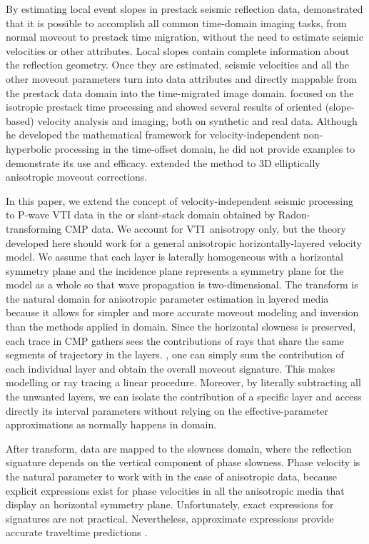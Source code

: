 By estimating local event slopes in prestack seismic reflection data,
\cite{fomel:S139} demonstrated that it is possible to accomplish all
common time-domain imaging tasks, from normal moveout to prestack time
migration, without the need to estimate seismic velocities or other
attributes. Local slopes contain complete information about the
reflection geometry. Once they are estimated, seismic velocities and
all the other moveout parameters turn into data attributes and
  directly mappable from the prestack data
domain into the time-migrated image domain. \cite{fomel:S139} focused
on the isotropic prestack time processing and showed several results
of oriented (slope-based) velocity analysis and imaging, both on
synthetic and real data. Although he developed the mathematical
framework for velocity-independent non-hyperbolic processing in the
time-offset \tx domain, he did not provide examples to demonstrate its
use and efficacy. \cite{burnett:WB129,burnett:3710} extended the
method to 3D elliptically anisotropic moveout corrections.

In this paper, we extend the concept of velocity-independent seismic
processing to P-wave VTI data in the \taup or slant-stack domain
obtained by Radon-transforming CMP data.  We account for
VTI\ anisotropy only, but the theory developed here should work for a
general anisotropic horizontally-layered velocity model. We assume
that each layer is laterally homogeneous with a horizontal symmetry
plane and  the incidence plane represents a symmetry plane
for the model as a whole so that wave propagation is
two-dimensional. The \taup transform is the natural domain for
anisotropic parameter estimation in layered media
\citep{baan:1076,douma:D53,fomel:2046} because it allows for simpler
and more accurate moveout modeling and inversion than the   methods applied in \tx domain. Since the
horizontal slowness is preserved, each trace in \taup CMP gathers sees
the contributions of rays that share the same segments of trajectory
in the layers.  , one can simply sum the
contribution of each individual layer and obtain the overall \taup
moveout signature. This makes modelling or ray tracing a linear
procedure. Moreover, by literally subtracting all the unwanted layers,
we can isolate the contribution of a specific layer and access
directly its interval parameters without relying on the
effective-parameter approximations as normally happens in \tx domain.

After \taup transform,  data are mapped to the slowness
domain, where the reflection signature depends on the vertical
component of phase slowness. Phase velocity is the natural parameter
to work with in the case of anisotropic data, because explicit
expressions exist for phase velocities in all the anisotropic media
that display an horizontal symmetry plane. Unfortunately, exact
expressions for \taup signatures are not 
practical. Nevertheless, approximate expressions provide accurate
traveltime predictions \citep{tsvankin:75A15}.

